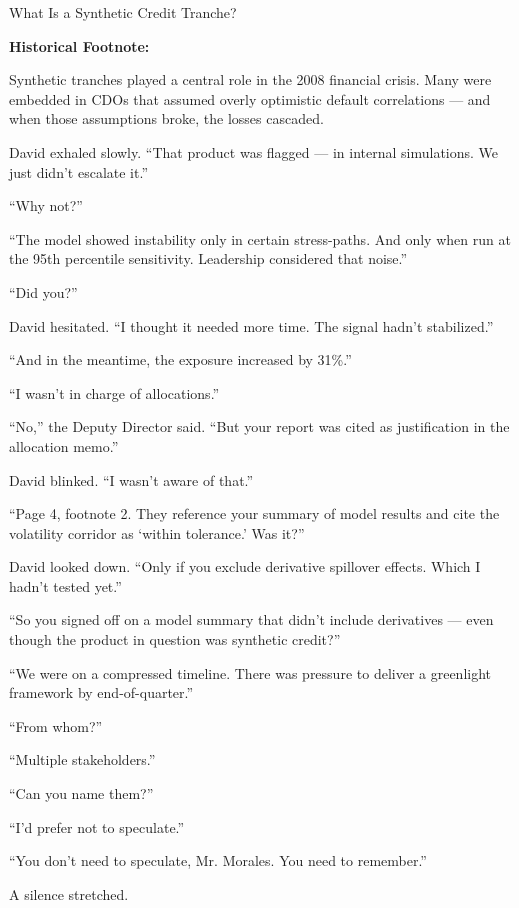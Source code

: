 \begin{TechnicalSidebar}{What Is a Synthetic Credit Tranche?}
  \medskip

  \textbf{Historical Footnote:}  

  \medskip

  Synthetic tranches played a central role in the 2008 financial crisis. Many were embedded in CDOs that assumed 
  overly optimistic default correlations — and when those assumptions broke, the losses cascaded.
  
\end{TechnicalSidebar}
 
\medskip

David exhaled slowly. ``That product was flagged — in internal simulations. We just didn’t escalate it.''

``Why not?''

``The model showed instability only in certain stress-paths. And only when run at the 95th percentile 
sensitivity.  Leadership considered that noise.''

``Did you?''

David hesitated. ``I thought it needed more time. The signal hadn’t stabilized.''

``And in the meantime, the exposure increased by 31\%.''

``I wasn’t in charge of allocations.''

``No,'' the Deputy Director said. ``But your report was cited as justification in the allocation memo.''

David blinked. ``I wasn’t aware of that.''

``Page 4, footnote 2. They reference your summary of model results and cite the volatility corridor 
as ‘within tolerance.’ Was it?''

David looked down. ``Only if you exclude derivative spillover effects. Which I hadn’t tested yet.''

``So you signed off on a model summary that didn’t include derivatives — even though the product 
in question was synthetic credit?''

``We were on a compressed timeline. There was pressure to deliver a greenlight framework by 
end-of-quarter.''

``From whom?''

``Multiple stakeholders.''

``Can you name them?''

``I'd prefer not to speculate.''

``You don’t need to speculate, Mr. Morales. You need to remember.''

A silence stretched.

